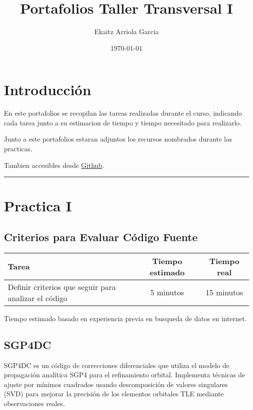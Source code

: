 \documentclass[12pt,a4paper]{article}
\title{Portafolios Taller Transversal I}
\author{Ekaitz Arriola Garcia}
\date{\today}
\newcommand{\separadorseccion}{%
    \vspace{1em}
    \hrule
    \vspace{1em}
}
\begin{document}
\maketitle
\tableofcontents
\newpage




\section{Introducción}

En este portafolios se recopilan las tareas realizadas durante el curso, indicando cada tarea junto a su estimacion de tiempo y tiempo necesitado para realizarlo.

Junto a este portafolios estaran adjuntos los recursos nombrados durante las practicas.

Tambien accesibles desde \href{https://github.com/Ekaitz723/tallerTraversal1/}{Github}.

\separadorseccion

\section{Practica I}

\subsection{Criterios para Evaluar Código Fuente}
    \begin{center}
        \begin{tabular}{|l|c|c|}
            \hline
            \textbf{Tarea} & \textbf{Tiempo estimado} & \textbf{Tiempo real} \\
            \hline
            Definir criterios que seguir para analizar el código & 5 minutos & 15 minutos \\
            \hline
        \end{tabular}
    \end{center}
    \begin{center}
        Tiempo estimado basado en experiencia previa en busqueda de datos en internet.
    \end{center}

\subsection{SGP4DC}
SGP4DC es un código de correcciones diferenciales que utiliza el modelo de propagación analítica SGP4 para el refinamiento orbital. Implementa técnicas de ajuste por mínimos cuadrados usando descomposición de valores singulares (SVD) para mejorar la precisión de los elementos orbitales TLE mediante observaciones reales.
\end{document}
